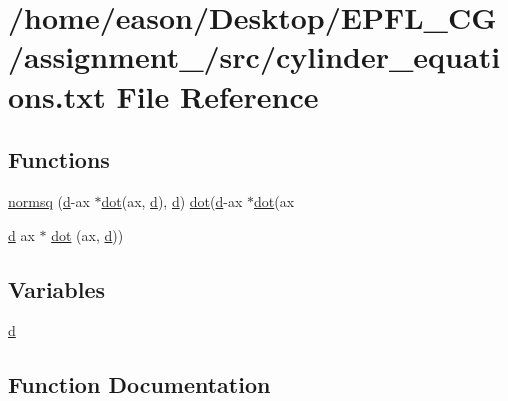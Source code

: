 \hypertarget{cylinder__equations_8txt}{}\section{/home/eason/\+Desktop/\+E\+P\+F\+L\+\_\+\+C\+G/assignment\+\_/src/cylinder\+\_\+equations.txt File Reference}
\label{cylinder__equations_8txt}
\subsection*{Functions}
\begin{DoxyCompactItemize}
\item 
\hyperlink{cylinder__equations_8txt_a3d9d9629b6723a2a412ec92ded5afc2d}{normsq} (\hyperlink{cylinder__equations_8txt_a1aabac6d068eef6a7bad3fdf50a05cc8}{d}-\/ax $\ast$\hyperlink{vec3_8h_ae151aaaf178ce355329547d9abd97089}{dot}(ax, \hyperlink{cylinder__equations_8txt_a1aabac6d068eef6a7bad3fdf50a05cc8}{d}), \hyperlink{cylinder__equations_8txt_a1aabac6d068eef6a7bad3fdf50a05cc8}{d}) \hyperlink{vec3_8h_ae151aaaf178ce355329547d9abd97089}{dot}(\hyperlink{cylinder__equations_8txt_a1aabac6d068eef6a7bad3fdf50a05cc8}{d}-\/ax $\ast$\hyperlink{vec3_8h_ae151aaaf178ce355329547d9abd97089}{dot}(ax
\item 
\hyperlink{cylinder__equations_8txt_a1aabac6d068eef6a7bad3fdf50a05cc8}{d} ax $\ast$ \hyperlink{cylinder__equations_8txt_abd8de84efa5361aaa8062a744a15c2f4}{dot} (ax, \hyperlink{cylinder__equations_8txt_a1aabac6d068eef6a7bad3fdf50a05cc8}{d}))
\end{DoxyCompactItemize}
\subsection*{Variables}
\begin{DoxyCompactItemize}
\item 
\hyperlink{cylinder__equations_8txt_a1aabac6d068eef6a7bad3fdf50a05cc8}{d}
\end{DoxyCompactItemize}


\subsection{Function Documentation}
